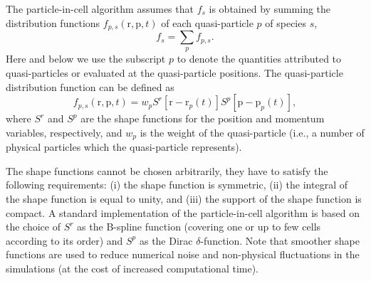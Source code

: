 \documentclass[10pt, a4paper, twoside, openright]{report}
\renewcommand{\vec}[1]{\boldsymbol{\mathrm{#1}}}
\begin{document}
The particle-in-cell algorithm assumes that $ f_{s} $ is obtained by summing the distribution functions $ f_{p, s} \left( \vec{r}, \vec{p}, t \right) $ of each quasi-particle $ p $ of species $ s $,
\begin{equation}\label{eq:dist_function}
	f_{s} =  \sum_{p} f_{p, s}.
\end{equation}
Here and below we use the subscript $ p $ to denote the quantities attributed to quasi-particles or evaluated at the quasi-particle positions. The quasi-particle distribution function can be defined as 
\begin{equation}\label{eq:quasi_particle_dist_function}
	f_{p, s} \left( \vec{r}, \vec{p}, t \right) = w_{p} S^r \left[ \vec{r} - \vec{r}_{p} \left( t \right) \right] S^p \left[ \vec{p} - \vec{p}_{p} \left( t \right) \right],
\end{equation}
where $ S^r $ and $ S^p $ are the shape functions for the position and momentum variables, respectively, and $ w_{p} $ is the weight of the quasi-particle (i.e., a number of physical particles which the quasi-particle represents).

The shape functions cannot be chosen arbitrarily, they have to satisfy the following requirements: (i) the shape function is symmetric, (ii) the integral of the shape function is equal to unity, and (iii) the support of the shape function is compact. A standard implementation of the particle-in-cell algorithm is based on the choice of $ S^r $ as the B-spline function (covering one or up to few cells according to its order) and $ S^p $ as the Dirac $ \delta $-function. Note that smoother shape functions are used to reduce numerical noise and non-physical fluctuations in the simulations (at the cost of increased computational time).
\end{document}
